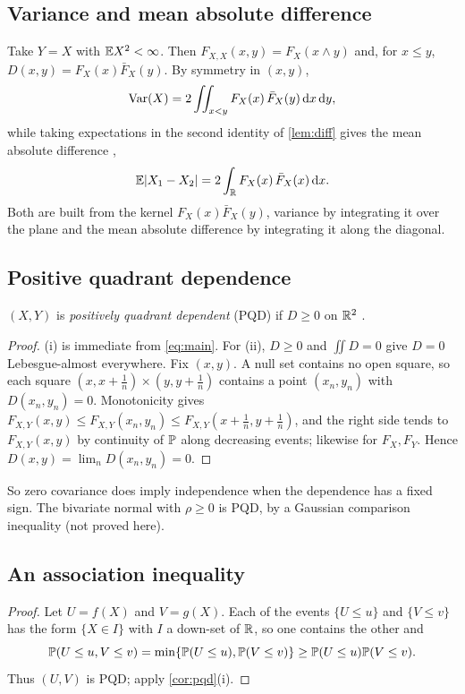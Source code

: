 \documentclass{saim-blog}
\begin{document}
\subsection{Variance and mean absolute difference}
Take $Y=X$ with $\mathbb{E} X^2<\infty$. Then $F_{X,X}(x,y)=F_X(x\wedge y)$ and, for $x\le y$, $D(x,y)=F_X(x)\bar F_X(y)$. By symmetry in $(x,y)$,
\begin{equation}\label{eq:var}
\operatorname{Var}(X)=2\iint_{x<y}F_X(x)\,\bar F_X(y)\mathop{}\!\mathrm{d} x\mathop{}\!\mathrm{d} y ,
\end{equation}
while taking expectations in the second identity of \cref{lem:diff} gives the mean absolute difference \citep{gini1912},
\[
\mathbb{E}|X_1-X_2|=2\int_{\mathbb{R}}F_X(x)\,\bar F_X(x)\mathop{}\!\mathrm{d} x .
\]
Both are built from the kernel $F_X(x)\bar F_X(y)$, variance by integrating it over the plane and the mean absolute difference by integrating it along the diagonal.

\subsection{Positive quadrant dependence}
$(X,Y)$ is \emph{positively quadrant dependent} (PQD) if $D\ge0$ on $\mathbb{R}^2$ \citep{lehmann1966}.

\begin{proof}
(i) is immediate from \eqref{eq:main}. For (ii), $D\ge0$ and $\iint D=0$ give $D=0$ Lebesgue-almost everywhere. Fix $(x,y)$. A null set contains no open square, so each square $(x,x+\tfrac1n)\times(y,y+\tfrac1n)$ contains a point $(x_n,y_n)$ with $D(x_n,y_n)=0$. Monotonicity gives $F_{X,Y}(x,y)\le F_{X,Y}(x_n,y_n)\le F_{X,Y}(x+\tfrac1n,y+\tfrac1n)$, and the right side tends to $F_{X,Y}(x,y)$ by continuity of $\mathbb{P}$ along decreasing events; likewise for $F_X,F_Y$. Hence $D(x,y)=\lim_n D(x_n,y_n)=0$.
\end{proof}
So zero covariance does imply independence when the dependence has a fixed sign. The bivariate normal with $\rho\ge0$ is PQD, by a Gaussian comparison inequality \citep{slepian1962} (not proved here).

\subsection{An association inequality}
\begin{proof}
Let $U=f(X)$ and $V=g(X)$. Each of the events $\{U\le u\}$ and $\{V\le v\}$ has the form $\{X\in I\}$ with $I$ a down-set of $\mathbb{R}$, so one contains the other and
\[
\mathbb{P}(U\le u,V\le v)=\min\{\mathbb{P}(U\le u),\mathbb{P}(V\le v)\}\ge\mathbb{P}(U\le u)\mathbb{P}(V\le v).
\]
Thus $(U,V)$ is PQD; apply \cref{cor:pqd}(i).
\end{proof}
\end{document}
